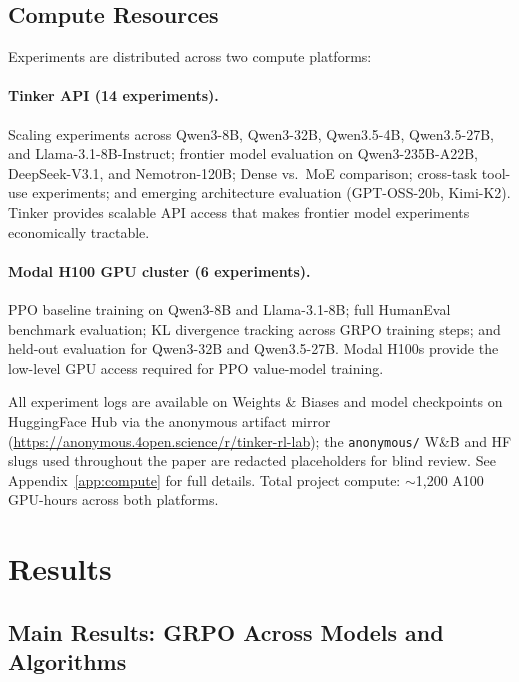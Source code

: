 \documentclass{article}
\begin{document}
\subsection{Compute Resources}

Experiments are distributed across two compute platforms:

\paragraph{Tinker API (14 experiments).}
Scaling experiments across Qwen3-8B, Qwen3-32B, Qwen3.5-4B, Qwen3.5-27B,
and Llama-3.1-8B-Instruct; frontier model evaluation on Qwen3-235B-A22B,
DeepSeek-V3.1, and Nemotron-120B; Dense vs.~MoE comparison; cross-task
tool-use experiments; and emerging architecture evaluation (GPT-OSS-20b,
Kimi-K2). Tinker provides scalable API access that makes frontier model
experiments economically tractable.

\paragraph{Modal H100 GPU cluster (6 experiments).}
PPO baseline training on Qwen3-8B and Llama-3.1-8B; full HumanEval
benchmark evaluation; KL divergence tracking across GRPO training steps;
and held-out evaluation for Qwen3-32B and Qwen3.5-27B. Modal H100s
provide the low-level GPU access required for PPO value-model training.

All experiment logs are available on Weights \& Biases and model
checkpoints on HuggingFace Hub via the anonymous artifact mirror
(\url{https://anonymous.4open.science/r/tinker-rl-lab}); the
\texttt{anonymous/} W\&B and HF slugs used throughout the paper are
redacted placeholders for blind review.
See Appendix~\ref{app:compute} for full details. Total project compute:
$\sim$1,200 A100 GPU-hours across both platforms.

\section{Results}
\label{sec:results}

\subsection{Main Results: GRPO Across Models and Algorithms}
\label{sec:main_results}
\end{document}
